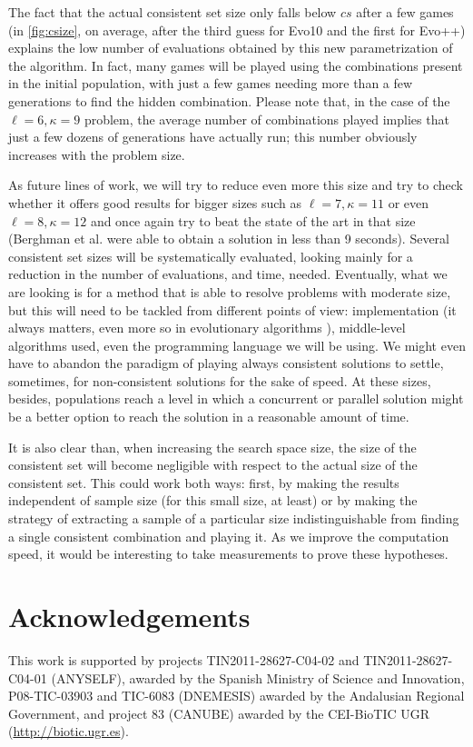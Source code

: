 \documentclass[conference]{IEEEtran}
\begin{document}
The fact that the actual consistent set size only falls below $cs$
after a few games (in \ref{fig:csize}, on average, after the third
guess for Evo10 and the first for Evo++)  explains the low number of
evaluations obtained by this new parametrization of the 
algorithm. In fact, many games will be played using the combinations
present in the initial population, with just a few games needing
more than a few generations to find the hidden combination. Please note that,
in the case of the $\ell=6,\kappa=9$ problem, the average number of combinations
played implies that just a few dozens of generations have actually
run; this number obviously increases with the problem size.

As future lines of work, we will try to reduce even more this size and
try to check whether it offers good results for bigger sizes such as
$\ell=7,\kappa=11$ or even $\ell=8,\kappa=12$ and once again try to
beat the state of the art in that size (Berghman et al. were able to
obtain a solution in less than 9 seconds).  Several consistent set
sizes will be systematically evaluated, looking mainly for a reduction
in the number of evaluations, and time, needed. Eventually, what we
are looking is for a method that is able to resolve problems with
moderate size, but this will need to be tackled from different points
of view: implementation (it always matters, even more so in evolutionary
algorithms \cite{DBLP:conf/iwann/MereloRACML11}), middle-level algorithms
used, even the programming language we will be using. We might even
have to abandon the paradigm of playing always consistent solutions to
settle, sometimes, for non-consistent solutions for the sake of
speed. At these sizes, besides, populations reach a level in which a
concurrent or parallel solution might be a better option to reach the
solution in a reasonable amount of time. 

It is also clear than, when increasing the search space size, the size
of the consistent set will become negligible with respect to the
actual size of the consistent set. This could work both ways: first,
by making the results independent of sample size (for this small size,
at least) or by making the strategy of extracting a sample of a
particular size indistinguishable from finding a single consistent
combination and playing it. As we improve the computation speed, it
would be interesting to take measurements to prove these hypotheses. 

\section*{Acknowledgements}
This work is supported by projects 
TIN2011-28627-C04-02 and TIN2011-28627-C04-01 (ANYSELF), awarded by the Spanish
Ministry of Science and Innovation, P08-TIC-03903 and TIC-6083
(DNEMESIS) awarded by the Andalusian Regional Government, and project
83 (CANUBE) awarded by the CEI-BioTIC UGR
(\url{http://biotic.ugr.es}). 
\end{document}
